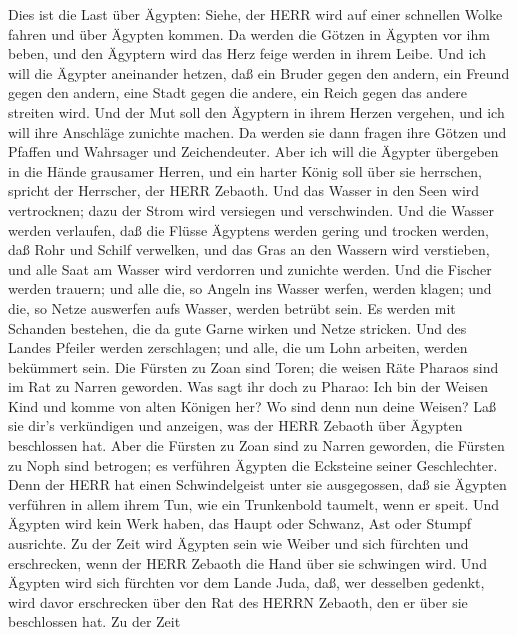  Dies ist die Last über Ägypten: Siehe, der HERR wird auf
einer schnellen Wolke fahren und über Ägypten kommen. Da werden die
Götzen in Ägypten vor ihm beben, und den Ägyptern wird das Herz feige
werden in ihrem Leibe.  Und ich will die Ägypter aneinander
hetzen, daß ein Bruder gegen den andern, ein Freund gegen den andern,
eine Stadt gegen die andere, ein Reich gegen das andere streiten wird.
 Und der Mut soll den Ägyptern in ihrem Herzen vergehen, und
ich will ihre Anschläge zunichte machen. Da werden sie dann fragen ihre
Götzen und Pfaffen und Wahrsager und Zeichendeuter.  Aber
ich will die Ägypter übergeben in die Hände grausamer Herren, und ein
harter König soll über sie herrschen, spricht der Herrscher, der HERR
Zebaoth.  Und das Wasser in den Seen wird vertrocknen; dazu
der Strom wird versiegen und verschwinden.  Und die Wasser
werden verlaufen, daß die Flüsse Ägyptens werden gering und trocken
werden, daß Rohr und Schilf verwelken,  und das Gras an den
Wassern wird verstieben, und alle Saat am Wasser wird verdorren und
zunichte werden.  Und die Fischer werden trauern; und alle
die, so Angeln ins Wasser werfen, werden klagen; und die, so Netze
auswerfen aufs Wasser, werden betrübt sein.  Es werden mit
Schanden bestehen, die da gute Garne wirken und Netze stricken.
 Und des Landes Pfeiler werden zerschlagen; und alle, die
um Lohn arbeiten, werden bekümmert sein.  Die Fürsten zu
Zoan sind Toren; die weisen Räte Pharaos sind im Rat zu Narren geworden.
Was sagt ihr doch zu Pharao: Ich bin der Weisen Kind und komme von alten
Königen her?  Wo sind denn nun deine Weisen? Laß sie dir's
verkündigen und anzeigen, was der HERR Zebaoth über Ägypten beschlossen
hat.  Aber die Fürsten zu Zoan sind zu Narren geworden, die
Fürsten zu Noph sind betrogen; es verführen Ägypten die Ecksteine seiner
Geschlechter.  Denn der HERR hat einen Schwindelgeist unter
sie ausgegossen, daß sie Ägypten verführen in allem ihrem Tun, wie ein
Trunkenbold taumelt, wenn er speit.  Und Ägypten wird kein
Werk haben, das Haupt oder Schwanz, Ast oder Stumpf ausrichte.
 Zu der Zeit wird Ägypten sein wie Weiber und sich fürchten
und erschrecken, wenn der HERR Zebaoth die Hand über sie schwingen wird.
 Und Ägypten wird sich fürchten vor dem Lande Juda, daß,
wer desselben gedenkt, wird davor erschrecken über den Rat des HERRN
Zebaoth, den er über sie beschlossen hat.  Zu der Zeit
